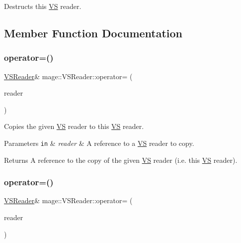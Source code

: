 Destructs this \hyperlink{structmage_1_1_v_s}{VS} reader. 

\subsection{Member Function Documentation}
\hypertarget{classmage_1_1_v_s_reader_ab7d85956947e6b2a28650498573bc055}{}\label{classmage_1_1_v_s_reader_ab7d85956947e6b2a28650498573bc055} 
\subsubsection{\texorpdfstring{operator=()}{operator=()}\hspace{0.1cm}{\footnotesize\ttfamily [1/2]}}
{\footnotesize\ttfamily \hyperlink{classmage_1_1_v_s_reader}{V\+S\+Reader}\& mage\+::\+V\+S\+Reader\+::operator= (\begin{DoxyParamCaption}\item[{const \hyperlink{classmage_1_1_v_s_reader}{V\+S\+Reader} \&}]{reader }\end{DoxyParamCaption})\hspace{0.3cm}{\ttfamily [delete]}}

Copies the given \hyperlink{structmage_1_1_v_s}{VS} reader to this \hyperlink{structmage_1_1_v_s}{VS} reader.


\begin{DoxyParams}[1]{Parameters}
\mbox{\tt in}  & {\em reader} & A reference to a \hyperlink{structmage_1_1_v_s}{VS} reader to copy. \\
\hline
\end{DoxyParams}
\begin{DoxyReturn}{Returns}
A reference to the copy of the given \hyperlink{structmage_1_1_v_s}{VS} reader (i.\+e. this \hyperlink{structmage_1_1_v_s}{VS} reader). 
\end{DoxyReturn}
\hypertarget{classmage_1_1_v_s_reader_a2be1e0645e3496f71c2f2b7fcf98ba2a}{}\label{classmage_1_1_v_s_reader_a2be1e0645e3496f71c2f2b7fcf98ba2a} 
\subsubsection{\texorpdfstring{operator=()}{operator=()}\hspace{0.1cm}{\footnotesize\ttfamily [2/2]}}
{\footnotesize\ttfamily \hyperlink{classmage_1_1_v_s_reader}{V\+S\+Reader}\& mage\+::\+V\+S\+Reader\+::operator= (\begin{DoxyParamCaption}\item[{\hyperlink{classmage_1_1_v_s_reader}{V\+S\+Reader} \&\&}]{reader }\end{DoxyParamCaption})\hspace{0.3cm}{\ttfamily [delete]}}

